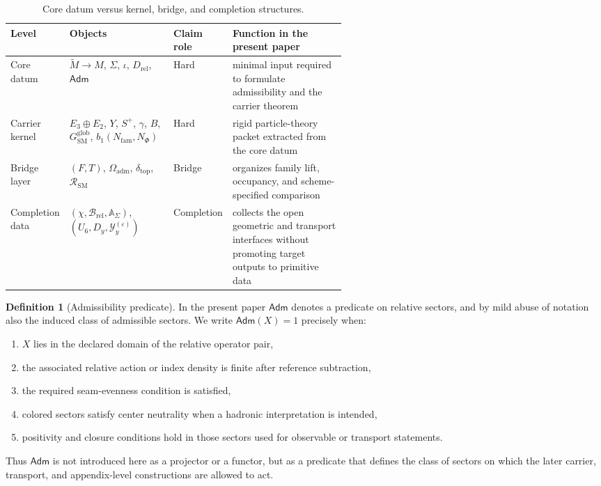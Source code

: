 \documentclass[11pt,a4paper]{article}
\theoremstyle{definition}
\newtheorem{definition}[theorem]{Definition}
\theoremstyle{remark}
\newcommand{\Seam}{\Sigma}
\newcommand{\inv}{\iota}
\newcommand{\deltatop}{\delta_{\mathrm{top}}}
\newcommand{\bone}{b_1}
\newcommand{\SM}{\mathrm{SM}}
\newcommand{\Oadm}{\Omega_{\mathrm{adm}}}
\begin{document}
\begin{table}[t]
\centering
\small
\begin{tabularx}{\linewidth}{@{}>{\raggedright\arraybackslash}p{0.12\linewidth}>{\raggedright\arraybackslash}p{0.31\linewidth}>{\raggedright\arraybackslash}p{0.13\linewidth}Y@{}}
\toprule
Level & Objects & Claim role & Function in the present paper \\
\midrule
Core datum & $\widetilde M\to M$, $\Seam$, $\inv$, $D_{\mathrm{rel}}$, $\mathsf{Adm}$ & Hard & minimal input required to formulate admissibility and the carrier theorem \\
Carrier kernel & $E_3\oplus E_2$, $Y$, $S^+$, $\gamma$, $B$, $G_{\SM}^{\mathrm{glob}}$, $\bone(N_{\mathrm{fam}},N_\Phi)$ & Hard & rigid particle-theory packet extracted from the core datum \\
Bridge layer & $(F,T)$, $\Oadm$, $\deltatop$, $\mathcal R_{\SM}$ & Bridge & organizes family lift, occupancy, and scheme-specified comparison \\
Completion data & $(\chi,\mathcal B_{\mathrm{rel}},\mathbb A_{\Seam})$, $(U_6,D_y,\mathcal Y_y^{(\varepsilon)})$ & Completion & collects the open geometric and transport interfaces without promoting target outputs to primitive data \\
\bottomrule
\end{tabularx}
\caption{Core datum versus kernel, bridge, and completion structures.}
\label{tab:layered-datum}
\end{table}

\begin{definition}[Admissibility predicate]
In the present paper $\mathsf{Adm}$ denotes a predicate on relative sectors, and by mild abuse of notation also the induced class of admissible sectors. We write $\mathsf{Adm}(X)=1$ precisely when:
\begin{enumerate}[label=(\arabic*), leftmargin=1.5em, topsep=3pt, itemsep=2pt]
    \item $X$ lies in the declared domain of the relative operator pair,
    \item the associated relative action or index density is finite after reference subtraction,
    \item the required seam-evenness condition is satisfied,
    \item colored sectors satisfy center neutrality when a hadronic interpretation is intended,
    \item positivity and closure conditions hold in those sectors used for observable or transport statements.
\end{enumerate}
Thus $\mathsf{Adm}$ is not introduced here as a projector or a functor, but as a predicate that defines the class of sectors on which the later carrier, transport, and appendix-level constructions are allowed to act.
\end{definition}
\end{document}
